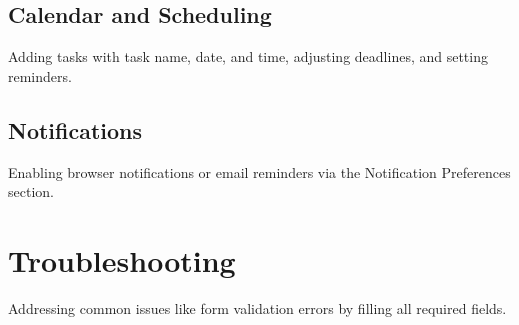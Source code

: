 \documentclass[a4paper,12pt]{article}
\begin{document}
\subsection{Calendar and Scheduling}
Adding tasks with task name, date, and time, adjusting deadlines, and setting reminders.

\subsection{Notifications}
Enabling browser notifications or email reminders via the Notification Preferences section.

\section{Troubleshooting}
Addressing common issues like form validation errors by filling all required fields.
\end{document}
